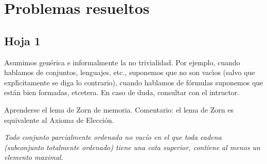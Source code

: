 \chapter{Problemas resueltos}
\section{Hoja 1}

	
	Asumimos gen\'erica e informalmente la no trivialidad. Por ejemplo,
	cuando hablamos de conjuntos, lenguajes, etc., suponemos que no  son vac\'{\i}os (salvo que 
	expl\'{\i}citamente
	se diga lo contrario),  cuando hablamos de f\'ormulas suponemos que est\'an bien formadas, etcetera.
	En caso de duda, consultar con el intructor. 
	
	\begin{problem}[1]
	Aprenderse el lema de Zorn de memoria. Comentario: el lema de Zorn es equivalente al Axioma de
	Elecci\'on.
	\solution
	
\textit{Todo conjunto parcialmente ordenado no vacío en el que toda cadena (subconjunto totalmente ordenado) tiene una cota superior, contiene al menos un elemento maximal.}
	
	
	\end{problem}
	
